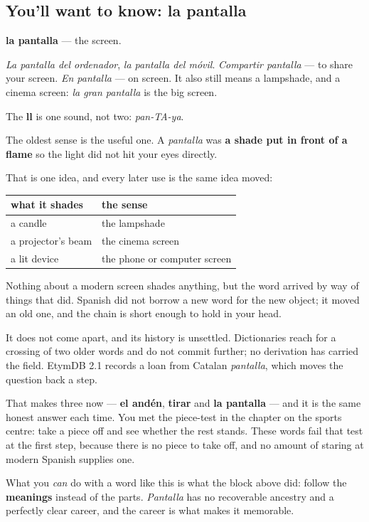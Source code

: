 \subsection*{You'll want to know: la pantalla}
\textbf{la pantalla} — the screen.

\emph{La pantalla del ordenador}, \emph{la pantalla del móvil}. \emph{Compartir pantalla} — to share your screen. \emph{En pantalla} — on screen. It also still means a lampshade, and a cinema screen: \emph{la gran pantalla} is the big screen.

The \textbf{ll} is one sound, not two: \emph{pan-TA-ya}.

\begin{culture}
The oldest sense is the useful one. A \emph{pantalla} was \textbf{a shade put in front of a flame} so the light did not hit your eyes directly.

That is one idea, and every later use is the same idea moved:

\noindent
\begin{tabularx}{\linewidth}{@{}>{\raggedright\arraybackslash}X>{\raggedright\arraybackslash}X@{}}
\toprule
\textbf{what it shades} & \textbf{the sense} \\
\midrule
a candle & the lampshade \\
a projector's beam & the cinema screen \\
a lit device & the phone or computer screen \\
\bottomrule
\end{tabularx}

Nothing about a modern screen shades anything, but the word arrived by way of things that did. Spanish did not borrow a new word for the new object; it moved an old one, and the chain is short enough to hold in your head.
\end{culture}

\begin{cousinweb}
It does not come apart, and its history is unsettled. Dictionaries reach for a crossing of two older words and do not commit further; no derivation has carried the field. EtymDB 2.1 records a loan from Catalan \emph{pantalla}, which moves the question back a step.

That makes three now — \textbf{el andén}, \textbf{tirar} and \textbf{la pantalla} — and it is the same honest answer each time. You met the piece-test in the chapter on the sports centre: take a piece off and see whether the rest stands. These words fail that test at the first step, because there is no piece to take off, and no amount of staring at modern Spanish supplies one.

What you \emph{can} do with a word like this is what the block above did: follow the \textbf{meanings} instead of the parts. \emph{Pantalla} has no recoverable ancestry and a perfectly clear career, and the career is what makes it memorable.
\end{cousinweb}

